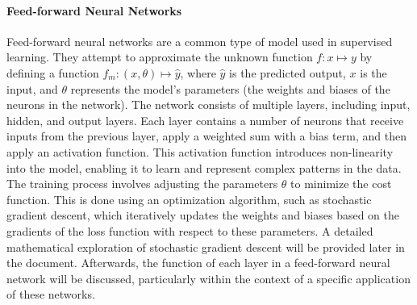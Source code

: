\paragraph{Feed-forward Neural Networks}\label{Basic_of_FFNN}
Feed-forward neural networks are a common type of model used in supervised learning. They attempt to approximate the unknown function $f: x \mapsto y$ by defining a function $f_{m}: (x,\theta) \mapsto \hat{y}$, where $\hat{y}$ is the predicted output, $x$ is the input, and $\theta$ represents the model's parameters (the weights and biases of the neurons in the network). The network consists of multiple layers, including input, hidden, and output layers. Each layer contains a number of neurons that receive inputs from the previous layer, apply a weighted sum with a bias term, and then apply an activation function. This activation function introduces non-linearity into the model, enabling it to learn and represent complex patterns in the data. The training process involves adjusting the parameters $\theta$ to minimize the cost function. This is done using an optimization algorithm, such as stochastic gradient descent, which iteratively updates the weights and biases based on the gradients of the loss function with respect to these parameters. A detailed mathematical exploration of stochastic gradient descent will be provided later in the document. Afterwards, the function of each layer in a feed-forward neural network will be discussed, particularly within the context of a specific application of these networks.
\newpage
